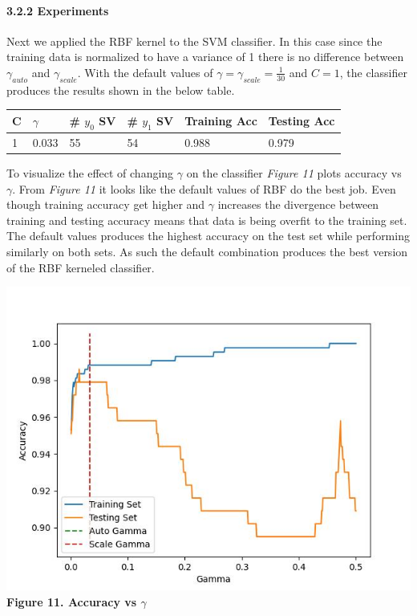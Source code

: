 \documentclass[11pt]{article}
\begin{document}
\hypertarget{experiments-1}{%
\paragraph{3.2.2 Experiments}\label{experiments-1}}

Next we applied the RBF kernel to the SVM classifier. In this case since
the training data is normalized to have a variance of 1 there is no
difference between \(\gamma_{auto}\) and \(\gamma_{scale}\). With the
default values of \(\gamma = \gamma_{scale} = \frac{1}{30}\) and
\(C = 1\), the classifier produces the results shown in the below table.

\begin{longtable}[]{@{}llllll@{}}
\toprule
C & \(\gamma\) & \# \(y_{0}\) SV & \# \(y_{1}\) SV & Training Acc &
Testing Acc \\
\midrule
\endhead
1 & 0.033 & 55 & 54 & 0.988 & 0.979 \\
\bottomrule
\end{longtable}

To visualize the effect of changing \(\gamma\) on the classifier
\emph{Figure 11} plots accuracy vs \(\gamma\). From \emph{Figure 11} it
looks like the default values of RBF do the best job. Even though
training accuracy get higher and \(\gamma\) increases the divergence
between training and testing accuracy means that data is being overfit
to the training set. The default values produces the highest accuracy on
the test set while performing similarly on both sets. As such the
default combination produces the best version of the RBF kerneled
classifier.

\includegraphics{figures/3_2_gamma.jpg}\\
\textbf{Figure 11. Accuracy vs \(\gamma\)}
\end{document}

